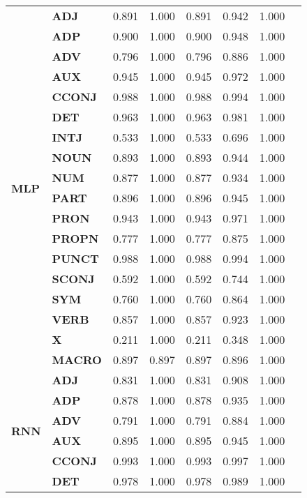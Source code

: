\begin{longtable}{|l||l||l||l||l||l||l||l|}
\cline{1-7}
\multirow[t]{18}{*}{\textbf{MLP}} & \textbf{ADJ} & 0.891 & 1.000 & 0.891 & 0.942 & 1.000 \\
\textbf{} & \textbf{ADP} & 0.900 & 1.000 & 0.900 & 0.948 & 1.000 \\
\textbf{} & \textbf{ADV} & 0.796 & 1.000 & 0.796 & 0.886 & 1.000 \\
\textbf{} & \textbf{AUX} & 0.945 & 1.000 & 0.945 & 0.972 & 1.000 \\
\textbf{} & \textbf{CCONJ} & 0.988 & 1.000 & 0.988 & 0.994 & 1.000 \\
\textbf{} & \textbf{DET} & 0.963 & 1.000 & 0.963 & 0.981 & 1.000 \\
\textbf{} & \textbf{INTJ} & 0.533 & 1.000 & 0.533 & 0.696 & 1.000 \\
\textbf{} & \textbf{NOUN} & 0.893 & 1.000 & 0.893 & 0.944 & 1.000 \\
\textbf{} & \textbf{NUM} & 0.877 & 1.000 & 0.877 & 0.934 & 1.000 \\
\textbf{} & \textbf{PART} & 0.896 & 1.000 & 0.896 & 0.945 & 1.000 \\
\textbf{} & \textbf{PRON} & 0.943 & 1.000 & 0.943 & 0.971 & 1.000 \\
\textbf{} & \textbf{PROPN} & 0.777 & 1.000 & 0.777 & 0.875 & 1.000 \\
\textbf{} & \textbf{PUNCT} & 0.988 & 1.000 & 0.988 & 0.994 & 1.000 \\
\textbf{} & \textbf{SCONJ} & 0.592 & 1.000 & 0.592 & 0.744 & 1.000 \\
\textbf{} & \textbf{SYM} & 0.760 & 1.000 & 0.760 & 0.864 & 1.000 \\
\textbf{} & \textbf{VERB} & 0.857 & 1.000 & 0.857 & 0.923 & 1.000 \\
\textbf{} & \textbf{X} & 0.211 & 1.000 & 0.211 & 0.348 & 1.000 \\
\textbf{} & \textbf{MACRO} & 0.897 & 0.897 & 0.897 & 0.896 & 1.000 \\
\cline{1-7}
\multirow[t]{18}{*}{\textbf{RNN}} & \textbf{ADJ} & 0.831 & 1.000 & 0.831 & 0.908 & 1.000 \\
\textbf{} & \textbf{ADP} & 0.878 & 1.000 & 0.878 & 0.935 & 1.000 \\
\textbf{} & \textbf{ADV} & 0.791 & 1.000 & 0.791 & 0.884 & 1.000 \\
\textbf{} & \textbf{AUX} & 0.895 & 1.000 & 0.895 & 0.945 & 1.000 \\
\textbf{} & \textbf{CCONJ} & 0.993 & 1.000 & 0.993 & 0.997 & 1.000 \\
\textbf{} & \textbf{DET} & 0.978 & 1.000 & 0.978 & 0.989 & 1.000 \\

\end{longtable}
